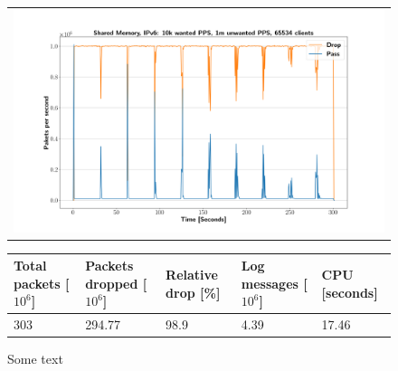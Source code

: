 \begin{figure}[!h]
	\label{fig:simplefail2ban:shm:ip6:1m}
	\centering
	\scriptsize
	\begin{tabular}{c}
    	\centerline{\includegraphics[width=1.2\textwidth]{images/simplefail2ban_shm_ipv6_v10k_iv1m_c65534.png}}
	\end{tabular}
	\begin{tabular}{lllll}
		\toprule
		\textbf{Total packets [$10^6$]} & \textbf{Packets dropped [$10^6$]} & \textbf{Relative drop [\%]} & \textbf{Log messages [$10^6$]} & \textbf{CPU [seconds]} \\ \midrule 
		303 & 294.77 & 98.9 & 4.39 & 17.46 \\
		\bottomrule
	\end{tabular}
	\caption[Simplefail2ban, Shared Memory, IPv6, 1m \ac{PPS}]{Some text}
\end{figure}

